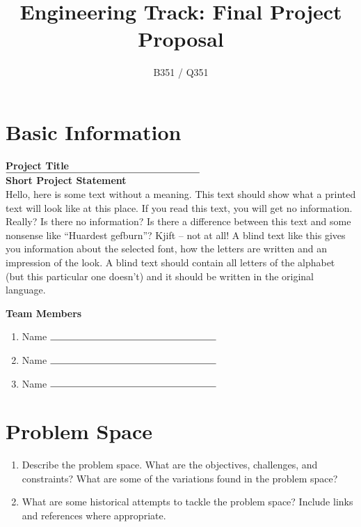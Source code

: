 \documentclass[]{article}
\title{\vspace{-2.5cm}Engineering Track: Final Project Proposal}
\author{B351 / Q351}
\date{}
\begin{document}
\maketitle

\section*{Basic Information}

\begin{multicols}{2}
	
\textbf{Project Title}\\

\vspace{0.25cm}
$\rule{7cm}{0.15mm}$\\

\textbf{Short Project Statement}\\
Hello, here is some text without a meaning.  This text should show what a printed text will look like at this place. If you read this text, you will get no information. Really? Is there no information?  Is there a difference between this text and some nonsense like ``Huardest gefburn''?  Kjift -- not at all!  A blind text like this gives you information about the selected font, how the letters are written and an impression of the look. A blind text should contain all letters of the alphabet (but this particular one doesn't) and it should be written in the original language.

\columnbreak
\textbf{Team Members}
\begin{enumerate}
	
	\vspace{0.5cm}
	\item Name $\rule{6cm}{0.15mm}$
	
	\vspace{1cm}
	\item Name $\rule{6cm}{0.15mm}$
	
	\vspace{1cm}
	\item Name $\rule{6cm}{0.15mm}$
	
	
\end{enumerate}

\end{multicols}

\section{Problem Space}
\begin{enumerate}
	\item Describe the problem space. What are the objectives, challenges, and constraints? What are some of the variations found in the problem space?

	\item What are some historical attempts to tackle the problem space? Include links and references where appropriate.
\end{enumerate}
\end{document}
